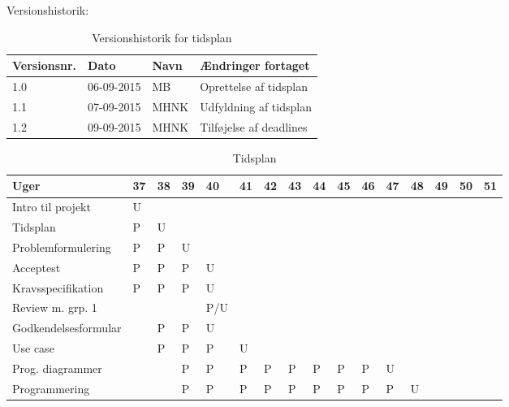 \documentclass[landscape, 12pt, letterpaper]{article}
\begin{document}
\begin{table}[]
Versionshistorik:
\centering
\caption{Versionshistorik for tidsplan}
\label{my-label}
\begin{tabular}{|l|l|l|l|}
\hline
Versionsnr. & Dato       & Navn & Ændringer fortaget     \\ \hline
1.0         & 06-09-2015 & MB   & Oprettelse af tidsplan \\ \hline
1.1         & 07-09-2015 & MHNK & Udfyldning af tidsplan \\ \hline
1.2         & 09-09-2015 & MHNK & Tilføjelse af deadlines\\ \hline
\end{tabular}
\end{table}


\begin{table}[]
\centering
\caption{Tidsplan}
\label{my-label}
\begin{tabular}{|l|l|l|l|l|l|l|l|l|l|l|l|l|l|l|l|}
\hline
Uger                    & 37 & 38 & 39 & 40 & 41 & 42 & 43 & 44 & 45 & 46 & 47 & 48 & 49 & 50 & 51 \\ \hline
Intro til projekt       & U  &    &    &    &    &    &    &    &    &    &    &    &    &    &    \\ \hline
Tidsplan                & P  & U  &    &    &    &    &    &    &    &    &    &    &    &    &    \\ \hline
Problemformulering      & P  & P  & U  &    &    &    &    &    &    &    &    &    &    &    &    \\ \hline
Acceptest               & P  & P  & P  & U  &    &    &    &    &    &    &    &    &    &    &    \\ \hline
Kravsspecifikation      & P  &  P & P  &  U &    &    &    &    &    &    &    &    &    &    &    \\ \hline
Review m. grp. 1        &    &    &    &P/U &    &    &    &    &    &    &    &    &    &    &    \\ \hline
Godkendelsesformular    &    &  P & P  & U  &    &    &    &    &    &    &    &    &    &    &    \\ \hline
Use case                &    &  P & P  & P  & U  &    &    &    &    &    &    &    &    &    &    \\ \hline
Prog. diagrammer        &    &    &  P & P  & P  & P  & P  & P  & P  & P  & U  &    &    &    &    \\ \hline
Programmering           &    &    &  P & P  &  P & P  & P  & P  & P  & P  & P  & U  &    &    &    \\ \hline

\end{tabular}
\end{table}
\end{document}
